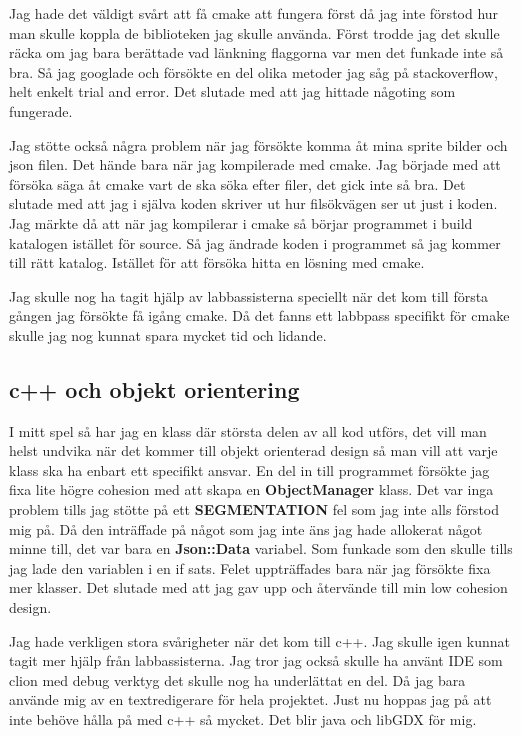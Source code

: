 \documentclass{TDP003mall}
\begin{document}
Jag hade det väldigt svårt att få cmake att fungera först då jag inte förstod hur man 
skulle koppla de biblioteken jag skulle använda. Först trodde jag det skulle räcka om jag bara
berättade vad länkning flaggorna var men det funkade inte så bra. Så jag googlade och försökte
en del olika metoder jag såg på stackoverflow, helt enkelt trial and error. 
Det slutade med att jag hittade någoting som fungerade. 

Jag stötte också några problem när jag försökte komma åt mina sprite bilder och json filen.
Det hände bara när jag kompilerade med cmake. Jag började med att försöka säga åt cmake vart
de ska söka efter filer, det gick inte så bra. Det slutade med att jag i själva koden skriver ut hur 
filsökvägen ser ut just i koden. Jag märkte då att när jag kompilerar i cmake så börjar 
programmet i build katalogen istället för source. Så jag ändrade koden i programmet så jag 
kommer till rätt katalog. Istället för att försöka hitta en lösning med cmake.

Jag skulle nog ha tagit hjälp av labbassisterna speciellt när det kom till första gången jag försökte 
få igång cmake. Då det fanns ett labbpass specifikt för cmake skulle jag nog kunnat spara mycket tid och lidande.

\subsection{c++ och objekt orientering}
I mitt spel så har jag en klass där största delen av all kod utförs, det vill man helst 
undvika när det kommer till objekt orienterad design så man vill att varje klass ska ha
enbart ett specifikt ansvar. En del in till programmet försökte jag fixa lite högre cohesion
med att skapa en \textbf{ObjectManager} klass. Det var inga problem tills jag stötte på ett
\textbf{SEGMENTATION} fel som jag inte alls förstod mig på. Då den inträffade på något som jag inte 
äns jag hade allokerat något minne till, det var bara en \textbf{Json::Data} variabel. 
Som funkade som den skulle tills jag lade den variablen i en if sats. 
Felet uppträffades bara när jag försökte fixa mer klasser. Det slutade med att jag gav upp 
och återvände till min low cohesion design. 

Jag hade verkligen stora svårigheter när det kom till c++. 
Jag skulle igen kunnat tagit mer hjälp från labbassisterna.
Jag tror jag också skulle ha använt IDE som clion med debug verktyg det skulle nog 
ha underlättat en del.
Då jag bara använde mig av en textredigerare för hela projektet.
Just nu hoppas jag på att inte behöve hålla på med c++ så mycket. 
Det blir java och libGDX för mig.
\end{document}
